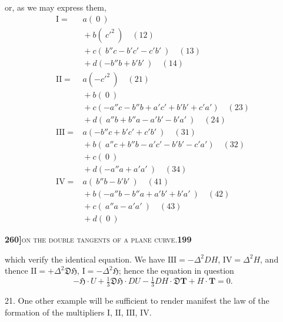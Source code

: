 \documentclass[11pt]{article}
\begin{document}
or, as we may express them,
\[
\begin{array}{rl}
\mathrm{I} = & a(\ 0\ )\\
& {} + b(\ c'^2\ )\quad (12)\\
& {} + c(\ b''c - b'c' - c'b'\ )\quad (13)\\
& {} + d(-b''b + b'b'\ )\quad (14)\\[4pt]
\mathrm{II} = & a(-c'^2\ )\quad (21)\\
& {} + b(\ 0\ )\\
& {} + c(-a''c - b''b + a'c' + b'b' + c'a')\quad (23)\\
& {} + d(\ a''b + b''a - a'b' - b'a'\ )\quad (24)\\[4pt]
\mathrm{III} = & a(-b''c + b'c' + c'b'\ )\quad (31)\\
& {} + b(\ a''c + b''b - a'c' - b'b' - c'a')\quad (32)\\
& {} + c(\ 0\ )\\
& {} + d(-a''a + a'a'\ )\quad (34)\\[4pt]
\mathrm{IV} = & a(\ b''b - b'b'\ )\quad (41)\\
& {} + b(-a''b - b''a + a'b' + b'a'\ )\quad (42)\\
& {} + c(\ a''a - a'a'\ )\quad (43)\\
& {} + d(\ 0\ )
\end{array}
\]

\newpage

\noindent\textbf{260]}\hfill\textsc{on the double tangents of a plane curve.}\hfill\textbf{199}

\medskip

\noindent which verify the identical equation. We have $\mathrm{III} = -\Delta^2 DH$, $\mathrm{IV} = \Delta^2 H$, and thence $\mathrm{II} = +\Delta^2\mathfrak{D}\mathfrak{H}$, $\mathrm{I} = -\Delta^2\mathfrak{H}$; hence the equation in question
\[
-\mathfrak{H} \cdot U + \tfrac{1}{3}\mathfrak{D}\mathfrak{H} \cdot DU - \tfrac{1}{3}DH \cdot \mathfrak{D}\mathbf{T} + H \cdot \mathbf{T} = 0.
\]

\medskip

21. One other example will be sufficient to render manifest the law of the formation of the multipliers $\mathrm{I}$, $\mathrm{II}$, $\mathrm{III}$, $\mathrm{IV}$.
\end{document}
